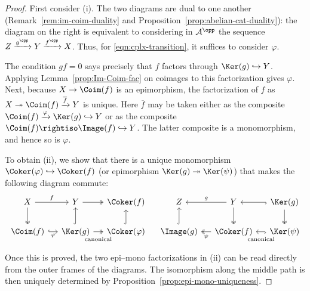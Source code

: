 \begin{proof}
	First consider (i). The two diagrams are dual to one another
	(Remark~\ref{rem:im-coim-duality} and
	Proposition~\ref{prop:abelian-cat-duality}): the diagram on the right is
	equivalent to considering in $\mathcal{A}^{\opp}$ the sequence
	$Z \xrightarrow{g^{\opp}} Y \xrightarrow{f^{\opp}} X$. Thus, for
	\eqref{eqn:cplx-transition}, it suffices to consider $\varphi$.

	The condition $gf=0$ says precisely that $f$ factors through
	$\Ker(g)\hookrightarrow Y$. Applying
	Lemma~\ref{prop:Im-Coim-fac} on coimages to this factorization gives
	$\varphi$. Next, because $X\to\Coim(f)$ is an epimorphism, the
	factorization of $f$ as
	$X \twoheadrightarrow \Coim(f) \xrightarrow{\overline{f}} Y$ is unique.
	Here $\overline{f}$ may be taken either as the composite
	$\Coim(f) \xrightarrow{\varphi} \Ker(g) \hookrightarrow Y$ or as the
	composite $\Coim(f) \rightiso \Image(f) \hookrightarrow Y$. The latter
	composite is a monomorphism, and hence so is $\varphi$.

	To obtain (ii), we show that there is a unique monomorphism
	$\Coker(\varphi)\hookrightarrow\Coker(f)$
	(or epimorphism $\Ker(g)\twoheadrightarrow\Ker(\psi)$) that makes the
	following diagram commute:
	\[
	\begin{tikzcd}[column sep=small]
		X \arrow[r, "f"] \arrow[twoheadrightarrow, d] & Y \arrow[twoheadrightarrow, r] & \Coker(f) \\
		\Coim(f) \arrow[hookrightarrow, r, "\varphi"'] & \Ker(g) \arrow[twoheadrightarrow, r, "\text{canonical}"' inner sep=0.6em] \arrow[hookrightarrow, u] & \Coker(\varphi) \arrow[hookrightarrow, u]
	\end{tikzcd} \quad
	\begin{tikzcd}[column sep=small]
		Z & Y \arrow[twoheadrightarrow, d] \arrow[l, "g"'] & \Ker(g) \arrow[twoheadrightarrow, d] \arrow[hookrightarrow, l] \\
		\Image(g) \arrow[hookrightarrow, u] & \Coker(f) \arrow[twoheadrightarrow, l, "\psi"] & \Ker(\psi) \arrow[hookrightarrow, l, "\text{canonical}" inner sep=0.6em]
	\end{tikzcd}
	\]
	Once this is proved, the two epi--mono factorizations in (ii) can be read
	directly from the outer frames of the diagrams. The isomorphism along the
	middle path is then uniquely determined by
	Proposition~\ref{prop:epi-mono-uniqueness}.


\end{proof}
